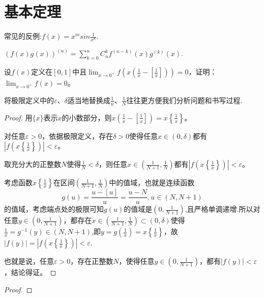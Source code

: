\documentclass[../../main.tex]{subfiles}
\begin{document}
\section{基本定理}

常见的反例:$f(x)=x^msin\frac{1}{x^n}.$

\begin{theorem}[Leibniz公式]\label{theorem:Leibniz公式}
$(f(x)g(x))^{(n)} = \sum_{k = 0}^{n} C_{n}^{k}f^{(n - k)}(x)g^{(k)}(x).$
\end{theorem}

\begin{example}
设\(f(x)\)定义在\([0,1]\)中且\(\lim_{x\rightarrow0^{+}}f\left(x\left(\frac{1}{x}-\left[\frac{1}{x}\right]\right)\right)=0\)，证明：\(\lim_{x\rightarrow0^{+}}f(x)=0\)。
\end{example}
\begin{note}
将极限定义中的$\varepsilon、\delta$适当地替换成$\frac{1}{n}、\frac{1}{N}$往往更方便我们分析问题和书写过程.
\end{note}
\begin{proof}
用\(\{x\}\)表示\(x\)的小数部分，则\(x\left(\frac{1}{x}-\left[\frac{1}{x}\right]\right)=x\left\{\frac{1}{x}\right\}\)。

对任意\(\varepsilon>0\)，依据极限定义，存在\(\delta>0\)使得任意\(x\in(0,\delta)\)都有\(\left|f\left(x\left\{\frac{1}{x}\right\}\right)\right|<\varepsilon\)。

取充分大的正整数\(N\)使得\(\frac{1}{N}<\delta\)，则任意\(x\in\left(\frac{1}{N + 1},\frac{1}{N}\right)\)都有\(\left|f\left(x\left\{\frac{1}{x}\right\}\right)\right|<\varepsilon\)。

考虑函数\(x\left\{\frac{1}{x}\right\}\)在区间\(\left(\frac{1}{N + 1},\frac{1}{N}\right)\)中的值域，也就是连续函数
\[g(u)=\frac{u - [u]}{u}=\frac{u - N}{u},u\in(N,N + 1)\]
的值域，考虑端点处的极限可知\(g(u)\)的值域是\(\left(0,\frac{1}{N + 1}\right)\),且严格单调递增.所以对任意\(y\in\left(0,\frac{1}{N + 1}\right)\)，都存在\(x\in\left(\frac{1}{N + 1},\frac{1}{N}\right)\subset(0,\delta)\)使得$\frac{1}{x}=g^{-1}(y)\in(N,N+1)$,即\(y =g(\frac{1}{x})= x\left\{\frac{1}{x}\right\}\)，故\(|f(y)|=\left|f\left(x\left\{\frac{1}{x}\right\}\right)\right|<\varepsilon\).

也就是说，任意\(\varepsilon>0\)，存在正整数\(N\)，使得任意\(y\in\left(0,\frac{1}{N + 1}\right)\)，都有\(|f(y)|<\varepsilon\)，结论得证。
\end{proof}

\begin{example}

\end{example}
\begin{proof}

\end{proof}
\end{document}
